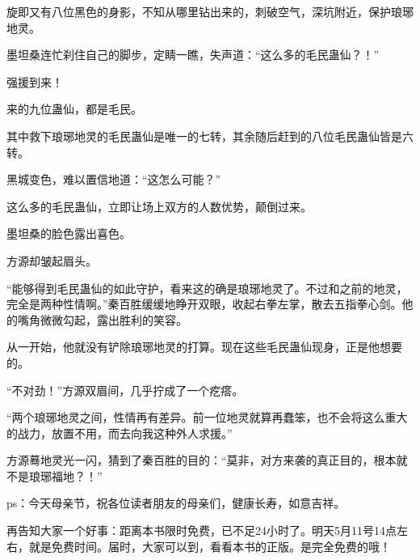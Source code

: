 \begin{this_body}
旋即又有八位黑色的身影，不知从哪里钻出来的，刺破空气，深坑附近，保护琅琊地灵。

墨坦桑连忙刹住自己的脚步，定睛一瞧，失声道：“这么多的毛民蛊仙？！”

强援到来！

来的九位蛊仙，都是毛民。

其中救下琅琊地灵的毛民蛊仙是唯一的七转，其余随后赶到的八位毛民蛊仙皆是六转。

黑城变色，难以置信地道：“这怎么可能？”

这么多的毛民蛊仙，立即让场上双方的人数优势，颠倒过来。

墨坦桑的脸色露出喜色。

方源却皱起眉头。

“能够得到毛民蛊仙的如此守护，看来这的确是琅琊地灵了。不过和之前的地灵，完全是两种性情啊。”秦百胜缓缓地睁开双眼，收起右拳左掌，散去五指拳心剑。他的嘴角微微勾起，露出胜利的笑容。

从一开始，他就没有铲除琅琊地灵的打算。现在这些毛民蛊仙现身，正是他想要的。

“不对劲！”方源双眉间，几乎拧成了一个疙瘩。

“两个琅琊地灵之间，性情再有差异。前一位地灵就算再蠢笨，也不会将这么重大的战力，放置不用，而去向我这种外人求援。”

方源蓦地灵光一闪，猜到了秦百胜的目的：“莫非，对方来袭的真正目的，根本就不是琅琊福地？！”

ps：今天母亲节，祝各位读者朋友的母亲们，健康长寿，如意吉祥。

再告知大家一个好事：距离本书限时免费，已不足24小时了。明天5月11号14点左右，就是免费时间。届时，大家可以到，看看本书的正版。是完全免费的哦！

\end{this_body}

